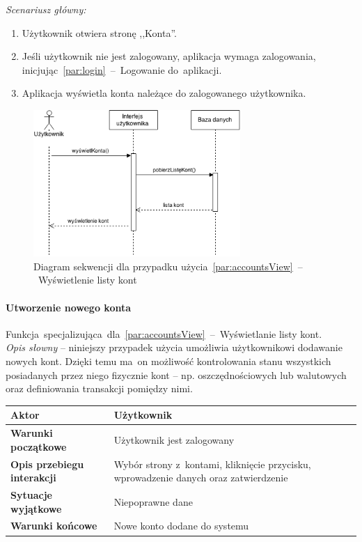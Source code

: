 \noindent \textit{Scenariusz główny:}
\begin{enumerate}
  \item Użytkownik otwiera stronę ,,Konta''.
  \item Jeśli użytkownik nie jest zalogowany, aplikacja wymaga zalogowania, inicjując~\ref{par:login}~--~Logowanie do~aplikacji.
  \item Aplikacja wyświetla konta należące do zalogowanego użytkownika.
\end{enumerate}

\begin{figure}[H]
  \centering
  \includegraphics[width=0.7\textwidth]{images/sequence-diagram-accounts-view.png}
  \caption{Diagram sekwencji dla przypadku użycia~\ref{par:accountsView}~--~Wyświetlenie listy kont}
\end{figure}

\paragraph{Utworzenie nowego konta\newline}
\label{par:accountCreate}
Funkcja~specjalizująca~dla~\ref{par:accountsView}~--~Wyświetlanie listy kont.\\

\textit{Opis słowny} -- niniejszy przypadek użycia umożliwia użytkownikowi dodawanie nowych kont. Dzięki temu ma~on możliwość kontrolowania stanu wszystkich posiadanych przez niego fizycznie kont -- np. oszczędnościowych lub walutowych oraz definiowania transakcji pomiędzy nimi.\\

\begin{tabular}{|l|p{9cm}|}
  \hline \textbf{Aktor} & Użytkownik \\ \hline
  \textbf{Warunki początkowe} & Użytkownik jest zalogowany \\ \hline
  \textbf{Opis przebiegu interakcji} & Wybór strony z~kontami, kliknięcie przycisku, wprowadzenie danych oraz zatwierdzenie \\ \hline
  \textbf{Sytuacje wyjątkowe} & Niepoprawne dane \\ \hline
  \textbf{Warunki końcowe} & Nowe konto dodane do systemu \\ \hline
\end{tabular}\\\\

